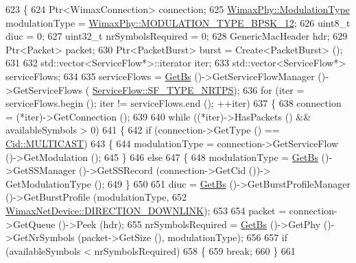 \begin{DoxyCode}
623 \{
624   Ptr<WimaxConnection> connection;
625   \hyperlink{classns3_1_1WimaxPhy_a044c5d8a48ca992c39c2a946f6e755fa}{WimaxPhy::ModulationType} modulationType = 
      \hyperlink{classns3_1_1WimaxPhy_a044c5d8a48ca992c39c2a946f6e755faaef0b78541d9b66d4e85780131e665028}{WimaxPhy::MODULATION\_TYPE\_BPSK\_12};
626   uint8\_t diuc = 0;
627   uint32\_t nrSymbolsRequired = 0;
628   GenericMacHeader hdr;
629   Ptr<Packet> packet;
630   Ptr<PacketBurst> burst = Create<PacketBurst> ();
631 
632   std::vector<ServiceFlow*>::iterator iter;
633   std::vector<ServiceFlow*> serviceFlows;
634 
635   serviceFlows = \hyperlink{classns3_1_1BSScheduler_a8b09065ac8f74cb35446af55128e41c7}{GetBs} ()->GetServiceFlowManager ()->GetServiceFlows (
      \hyperlink{classns3_1_1ServiceFlow_a7990ba10be1e098328fd1e6382a26235a7f8577f851a9f01d159442a3a3fcdf48}{ServiceFlow::SF\_TYPE\_NRTPS});
636   \textcolor{keywordflow}{for} (iter = serviceFlows.begin (); iter != serviceFlows.end (); ++iter)
637     \{
638       connection = (*iter)->GetConnection ();
639 
640       \textcolor{keywordflow}{while} ((*iter)->HasPackets () && availableSymbols > 0)
641         \{
642           \textcolor{keywordflow}{if} (connection->GetType () == \hyperlink{classns3_1_1Cid_a10b8f92080ca5790e65a0bfa2f557e0aa4d3bf31623ed09b9755d86bdfa345a4a}{Cid::MULTICAST})
643             \{
644               modulationType = connection->GetServiceFlow ()->GetModulation ();
645             \}
646           \textcolor{keywordflow}{else}
647             \{
648               modulationType = \hyperlink{classns3_1_1BSScheduler_a8b09065ac8f74cb35446af55128e41c7}{GetBs} ()->GetSSManager ()->GetSSRecord (connection->GetCid ())->
      GetModulationType ();
649             \}
650 
651           diuc = \hyperlink{classns3_1_1BSScheduler_a8b09065ac8f74cb35446af55128e41c7}{GetBs} ()->GetBurstProfileManager ()->GetBurstProfile (modulationType,
652                                                                        
      \hyperlink{classns3_1_1WimaxNetDevice_a194b6cf7eb59582328eb2531dc9ed884a5873dae7c36e21d904ae2d6922835e89}{WimaxNetDevice::DIRECTION\_DOWNLINK});
653 
654           packet = connection->GetQueue ()->Peek (hdr);
655           nrSymbolsRequired = \hyperlink{classns3_1_1BSScheduler_a8b09065ac8f74cb35446af55128e41c7}{GetBs} ()->GetPhy ()->GetNrSymbols (packet->GetSize (), modulationType);
656 
657           \textcolor{keywordflow}{if} (availableSymbols < nrSymbolsRequired)
658             \{
659               \textcolor{keywordflow}{break};
660             \}
661 

\end{DoxyCode}
